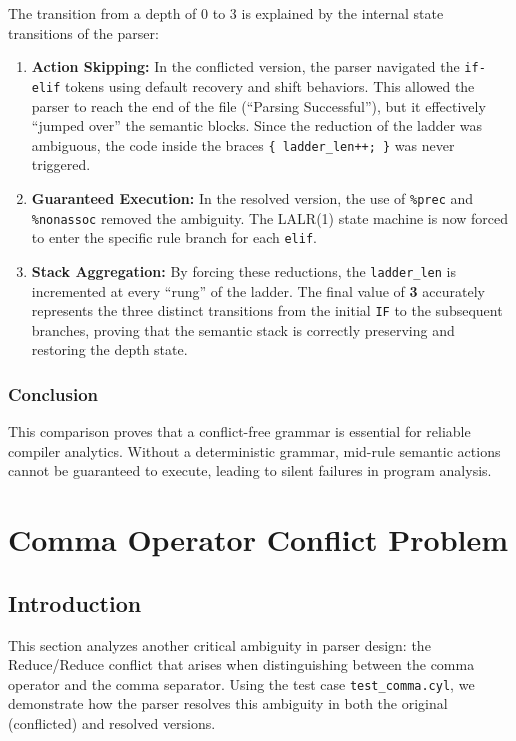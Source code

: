 \documentclass{article}
\begin{document}
The transition from a depth of 0 to 3 is explained by the internal state transitions of the parser:

\begin{enumerate}
    \item \textbf{Action Skipping:} In the conflicted version, the parser navigated the \texttt{if-elif} tokens using default recovery and shift behaviors. This allowed the parser to reach the end of the file (``Parsing Successful''), but it effectively ``jumped over'' the semantic blocks. Since the reduction of the ladder was ambiguous, the code inside the braces \texttt{\{ ladder\_len++; \}} was never triggered.
    
    \item \textbf{Guaranteed Execution:} In the resolved version, the use of \texttt{\%prec} and \texttt{\%nonassoc} removed the ambiguity. The LALR(1) state machine is now forced to enter the specific rule branch for each \texttt{elif}.
    
    \item \textbf{Stack Aggregation:} By forcing these reductions, the \texttt{ladder\_len} is incremented at every ``rung'' of the ladder. The final value of \textbf{3} accurately represents the three distinct transitions from the initial \texttt{IF} to the subsequent branches, proving that the semantic stack is correctly preserving and restoring the depth state.
\end{enumerate}

\subsubsection{Conclusion}

This comparison proves that a conflict-free grammar is essential for reliable compiler analytics. Without a deterministic grammar, mid-rule semantic actions cannot be guaranteed to execute, leading to silent failures in program analysis.

\newpage

\section{Comma Operator Conflict Problem}
\label{sec:comma_operator_analysis}

\subsection{Introduction}

This section analyzes another critical ambiguity in parser design: the Reduce/Reduce conflict that arises when distinguishing between the comma operator and the comma separator. Using the test case \texttt{test\_comma.cyl}, we demonstrate how the parser resolves this ambiguity in both the original (conflicted) and resolved versions.
\end{document}
